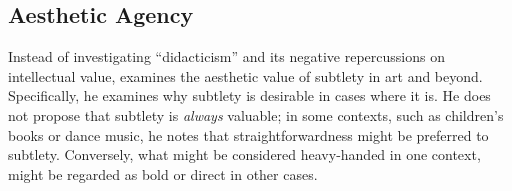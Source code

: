 \subsection{Aesthetic Agency} \label{sec:aesthetic_agency}

Instead of investigating ``didacticism'' and its negative repercussions on intellectual value, \textcite{king_virtue_2017} examines the aesthetic value of subtlety in art and beyond. Specifically, he examines why subtlety is desirable in cases where it is. He does not propose that subtlety is \textit{always} valuable; in some contexts, such as children's books or dance music, he notes that straightforwardness might be preferred to subtlety. Conversely, what might be considered heavy-handed in one context, might be regarded as bold or direct in other cases.






